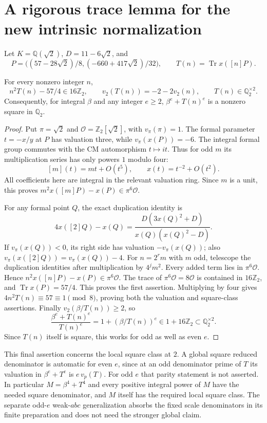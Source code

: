\documentclass[11pt,a4paper]{article}
\newcommand{\Q}{\mathbb Q}\newcommand{\Z}{\mathbb Z}
\newcommand{\Tr}{\operatorname{Tr}}\newcommand{\N}{\operatorname{N}}
\begin{document}
\section{A rigorous trace lemma for the new intrinsic normalization}
Let $K=\Q(\sqrt2)$, $D=11-6\sqrt2$, and
\[
 P=\big((57-28\sqrt2)/8,(-660+417\sqrt2)/32\big),\qquad
 T(n)=\Tr x([n]P).
\]
\begin{lemma}
For every nonzero integer $n$,
\[
 n^2T(n)-57/4\in16\Z_2,\qquad
 v_2(T(n))=-2-2v_2(n),\qquad T(n)\in\Q_2^{\times2}.
\]
Consequently, for integral $\beta$ and any integer $e\ge2$,
$\beta^e+T(n)^e$ is a nonzero square in $\Q_2$.
\end{lemma}
\begin{proof}
Put $\pi=\sqrt2$ and $\mathcal O=\Z_2[\sqrt2]$, with $v_\pi(\pi)=1$.
The formal parameter $t=-x/y$ at $P$ has valuation three, while
$v_\pi(x(P))=-6$. The integral formal group commutes with the CM
automorphism $t\mapsto it$. Thus for odd $m$ its multiplication series
has only powers $1$ modulo four:
\[
 [m](t)=mt+O(t^5),\qquad x(t)=t^{-2}+O(t^2).
\]
All coefficients here are integral in the relevant valuation ring.
Since $m$ is a unit, this proves
$m^2x([m]P)-x(P)\in\pi^6\mathcal O$.

For any formal point $Q$, the exact duplication identity is
\[
 4x([2]Q)-x(Q)
  =\frac{D(3x(Q)^2+D)}{x(Q)(x(Q)^2-D)}.
\]
If $v_\pi(x(Q))<0$, its right side has valuation $-v_\pi(x(Q))$;
also $v_\pi(x([2]Q))=v_\pi(x(Q))-4$.
For $n=2^rm$ with $m$ odd, telescope the duplication identities after
multiplication by $4^jm^2$. Every added term lies in
$\pi^6\mathcal O$. Hence $n^2x([n]P)-x(P)\in\pi^6\mathcal O$.
The trace of $\pi^6\mathcal O=8\mathcal O$ is contained in $16\Z_2$,
and $\Tr x(P)=57/4$. This proves the first assertion. Multiplying by
four gives $4n^2T(n)\equiv57\equiv1\pmod8$, proving both the valuation
and square-class assertions. Finally $v_2(\beta/T(n))\ge2$, so
\[
 \frac{\beta^e+T(n)^e}{T(n)^e}
      =1+(\beta/T(n))^e\in1+16\Z_2\subset\Q_2^{\times2}.
\]
Since $T(n)$ itself is square, this works for odd as well as even $e$.
\end{proof}

This final assertion concerns the local square class at $2$. A global
square reduced denominator is automatic for even $e$, since at an odd
denominator prime of $T$ its valuation in $\beta^e+T^e$ is $e\,v_p(T)$.
For odd $e$ that parity statement is not asserted. In particular
$M=\beta^4+T^4$ and every positive integral power of $M$ have the needed
square denominator, and $M$ itself has the required local square class.
The separate odd-$e$ weak-$abc$ generalization absorbs the fixed scale
denominators in its finite preparation and does not need the stronger
global claim.
\end{document}
